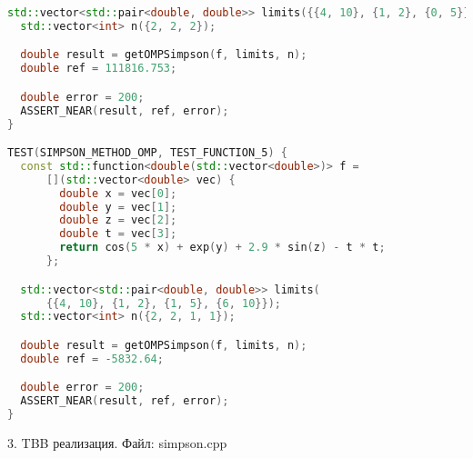 \documentclass{report}
\begin{document}
\begin{lstlisting}[language=C++]
  std::vector<std::pair<double, double>> limits({{4, 10}, {1, 2}, {0, 5}});
  std::vector<int> n({2, 2, 2});

  double result = getOMPSimpson(f, limits, n);
  double ref = 111816.753;

  double error = 200;
  ASSERT_NEAR(result, ref, error);
}

TEST(SIMPSON_METHOD_OMP, TEST_FUNCTION_5) {
  const std::function<double(std::vector<double>)> f =
      [](std::vector<double> vec) {
        double x = vec[0];
        double y = vec[1];
        double z = vec[2];
        double t = vec[3];
        return cos(5 * x) + exp(y) + 2.9 * sin(z) - t * t;
      };

  std::vector<std::pair<double, double>> limits(
      {{4, 10}, {1, 2}, {1, 5}, {6, 10}});
  std::vector<int> n({2, 2, 1, 1});

  double result = getOMPSimpson(f, limits, n);
  double ref = -5832.64;

  double error = 200;
  ASSERT_NEAR(result, ref, error);
}
\end{lstlisting}

\par 3. TBB реализация. Файл: simpson.cpp
\end{document}
